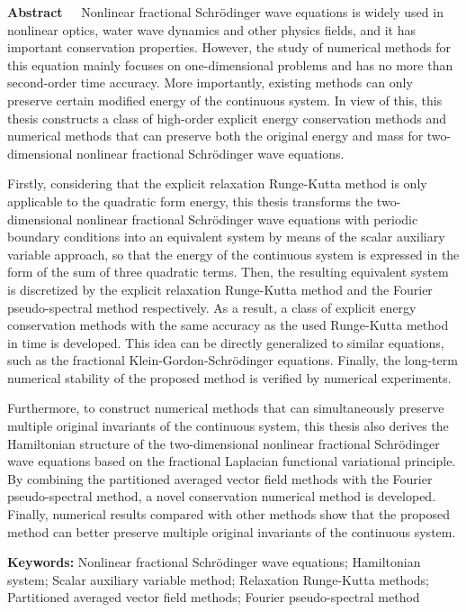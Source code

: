 \begin{EnglishAbstract}
\item {\bf Abstract\ \ } 
Nonlinear fractional Schr{\"o}dinger wave equations is widely used in nonlinear optics, water wave dynamics and other physics fields, and it has important conservation properties. However, the study of numerical methods for this equation mainly focuses on one-dimensional problems and has no more than second-order time accuracy. More importantly, existing methods can only preserve certain modified energy of the continuous system. In view of this, this thesis constructs a class of high-order explicit energy conservation methods and numerical methods that can preserve both the original energy and mass for two-dimensional nonlinear fractional Schr{\"o}dinger wave equations.

Firstly, considering that the explicit relaxation Runge-Kutta method is only applicable to the quadratic form energy, this thesis transforms the two-dimensional nonlinear fractional Schr{\"o}dinger wave equations with periodic boundary conditions into an equivalent system by means of the scalar auxiliary variable approach, so that the energy of the continuous system is expressed in the form of the sum of three quadratic terms. Then, the resulting equivalent system is discretized by the explicit relaxation Runge-Kutta method and the Fourier pseudo-spectral method respectively. As a result, a class of explicit energy conservation methods with the same accuracy as the used Runge-Kutta method in time is developed. This idea can be directly generalized to similar equations, such as the fractional Klein-Gordon-Schr{\"o}dinger equations. Finally, the long-term numerical stability of the proposed method is verified by numerical experiments.

Furthermore, to construct numerical methods that can simultaneously preserve multiple original invariants of the continuous system, this thesis also derives the Hamiltonian structure of the two-dimensional nonlinear fractional Schr{\"o}dinger wave equations based on the fractional Laplacian functional variational principle. By combining the partitioned averaged vector field methods with the Fourier pseudo-spectral method, a novel conservation numerical method is developed. Finally, numerical results compared with other methods show that the proposed method can better preserve multiple original invariants of the continuous system.

\item {\bf Keywords:} Nonlinear fractional Schr{\"o}dinger wave equations; Hamiltonian system; Scalar auxiliary variable method; Relaxation Runge-Kutta methods; Partitioned averaged vector field methods; Fourier pseudo-spectral method
\end{EnglishAbstract}